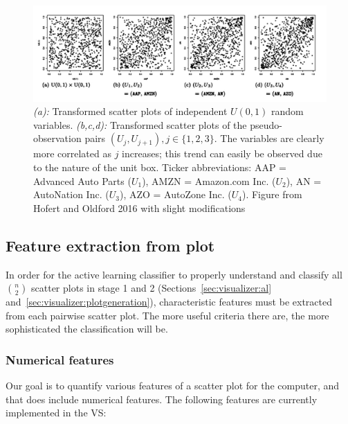 \begin{figure}[htb]
	\begin{center}
		\includegraphics[width=1\linewidth]{ch-visualizer/figures/hofertoldford}
		\caption[Transformed scatter plots of independent $U(0,1)$ random 
		variables and pseudo-observation pairs $(U_{j},U_{j+1}),j\in 
		\{1,2,3\}$.]{\textit{(a):} 
		Transformed scatter plots of independent $U(0,1)$ random variables. 
		\textit{(b,c,d):} Transformed scatter plots of the pseudo-observation 
		pairs $(U_{j},U_{j+1}),j\in \{1,2,3\}$. The variables are clearly more 
		correlated as $j$ increases; this trend can easily be observed due to 
		the nature of the unit box. Ticker abbreviations: 
		AAP = Advanced Auto Parts ($U_1$), AMZN = Amazon.com Inc. ($U_2$), 
		AN = AutoNation Inc. ($U_3$), AZO = AutoZone Inc. ($U_4$).
		Figure from Hofert and Oldford 2016 with slight 
		modifications~\cite{hofert2016}}
		\label{fig:visualizer:hofertoldford}
	\end{center}
\end{figure}

\subsection{Feature extraction from plot}
\label{sec:visualizer:scatterplot:features}

In order for the active learning classifier to properly understand and classify 
all $n \choose 2$ scatter plots in stage 1 and 2
(Sections~\ref{sec:visualizer:al} and~\ref{sec:visualizer:plotgeneration}), 
characteristic features must be extracted from each pairwise scatter plot. The 
more useful criteria there are, the more sophisticated the classification will 
be.

\subsubsection{Numerical features}

Our goal is to quantify various features of a scatter plot for the computer, 
and that does include numerical features. The following features are currently 
implemented in the VS: 

